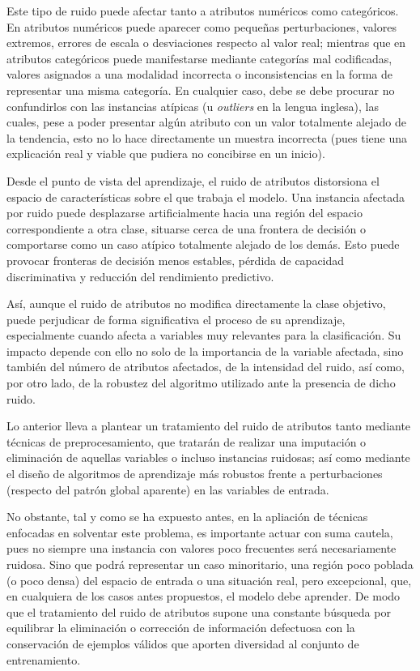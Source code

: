\documentclass[print, color]{ugrTFG}
\begin{document}
Este tipo de ruido puede afectar tanto a atributos numéricos como categóricos. En atributos numéricos puede aparecer como pequeñas perturbaciones, valores extremos, errores de escala o desviaciones respecto al valor real; mientras que en atributos categóricos puede manifestarse mediante categorías mal codificadas, valores asignados a una modalidad incorrecta o inconsistencias en la forma de representar una misma categoría. En cualquier caso, debe se debe procurar no confundirlos con las instancias atípicas (u \textit{outliers} en la lengua inglesa), las cuales, pese a poder presentar algún atributo con un valor totalmente alejado de la tendencia, esto no lo hace directamente un muestra incorrecta (pues tiene una explicación real y viable que pudiera no concibirse en un inicio).

Desde el punto de vista del aprendizaje, el ruido de atributos distorsiona el espacio de características sobre el que trabaja el modelo. Una instancia afectada por ruido puede desplazarse artificialmente hacia una región del espacio correspondiente a otra clase, situarse cerca de una frontera de decisión o comportarse como un caso atípico totalmente alejado de los demás. Esto puede provocar fronteras de decisión menos estables, pérdida de capacidad discriminativa y reducción del rendimiento predictivo.

Así, aunque el ruido de atributos no modifica directamente la clase objetivo, puede perjudicar de forma significativa el proceso de su aprendizaje, especialmente cuando afecta a variables muy relevantes para la clasificación. Su impacto depende con ello no solo de la importancia de la variable afectada, sino también del número de atributos afectados, de la intensidad del ruido, así como, por otro lado, de la robustez del algoritmo utilizado ante la presencia de dicho ruido.

Lo anterior lleva a plantear un tratamiento del ruido de atributos tanto mediante técnicas de preprocesamiento, que tratarán de realizar una imputación o eliminación de aquellas variables o incluso instancias ruidosas; así como mediante el diseño de algoritmos de aprendizaje más robustos frente a perturbaciones (respecto del patrón global aparente) en las variables de entrada. 

No obstante, tal y como se ha expuesto antes, en la apliación de técnicas enfocadas en solventar este problema, es importante actuar con suma cautela, pues no siempre una instancia con valores poco frecuentes será necesariamente ruidosa. Sino que podrá representar un caso minoritario, una región poco poblada (o poco densa) del espacio de entrada o una situación real, pero excepcional, que, en cualquiera de los casos antes propuestos, el modelo debe aprender. De modo que el tratamiento del ruido de atributos supone una constante búsqueda por equilibrar la eliminación o corrección de información defectuosa con la conservación de ejemplos válidos que aporten diversidad al conjunto de entrenamiento.
\end{document}
